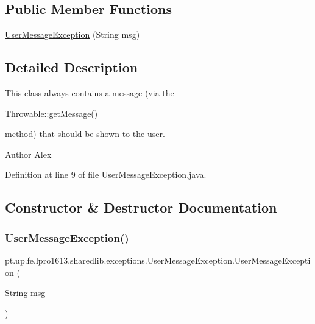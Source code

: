 \subsection*{Public Member Functions}
\begin{DoxyCompactItemize}
\item 
\hyperlink{classpt_1_1up_1_1fe_1_1lpro1613_1_1sharedlib_1_1exceptions_1_1_user_message_exception_a036981d147af9b157ade7a6eb0dfb280}{User\+Message\+Exception} (String msg)
\end{DoxyCompactItemize}


\subsection{Detailed Description}
This class always contains a message (via the
\begin{DoxyCode}
Throwable::getMessage() 
\end{DoxyCode}
 method) that should be shown to the user.

\begin{DoxyAuthor}{Author}
Alex 
\end{DoxyAuthor}


Definition at line 9 of file User\+Message\+Exception.\+java.



\subsection{Constructor \& Destructor Documentation}
\hypertarget{classpt_1_1up_1_1fe_1_1lpro1613_1_1sharedlib_1_1exceptions_1_1_user_message_exception_a036981d147af9b157ade7a6eb0dfb280}{}\label{classpt_1_1up_1_1fe_1_1lpro1613_1_1sharedlib_1_1exceptions_1_1_user_message_exception_a036981d147af9b157ade7a6eb0dfb280} 
\subsubsection{\texorpdfstring{User\+Message\+Exception()}{UserMessageException()}}
{\footnotesize\ttfamily pt.\+up.\+fe.\+lpro1613.\+sharedlib.\+exceptions.\+User\+Message\+Exception.\+User\+Message\+Exception (\begin{DoxyParamCaption}\item[{String}]{msg }\end{DoxyParamCaption})}

